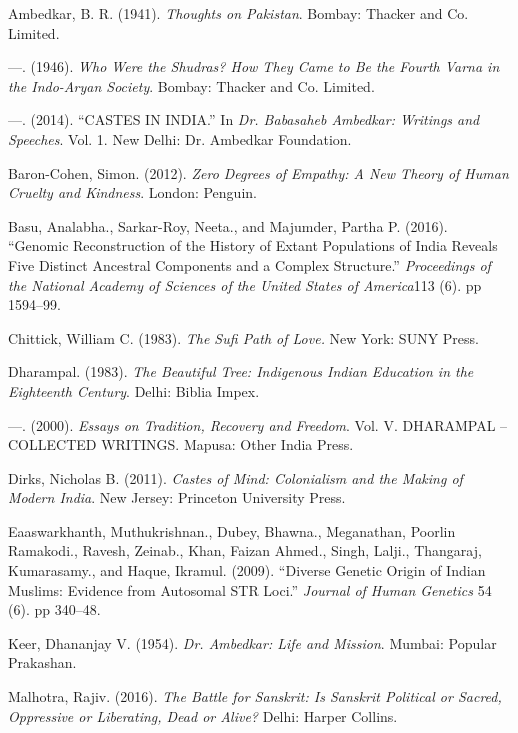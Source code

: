 \begin{thebibliography}{99}
\itemsep=0pt
 Ambedkar, B. R. (1941). \textit{Thoughts on Pakistan}. Bombay: Thacker and Co. Limited.

  ---. (1946). \textit{Who Were the Shudras? How They Came to Be the Fourth Varna in the Indo-Aryan Society}. Bombay: Thacker and Co. Limited.

  ---. (2014). “CASTES IN INDIA.” In \textit{Dr. Babasaheb Ambedkar: Writings and Speeches}. Vol. 1. New Delhi: Dr. Ambedkar Foundation.

  Baron-Cohen, Simon. (2012). \textit{Zero Degrees of Empathy: A New Theory of Human Cruelty and Kindness}. London: Penguin.

  Basu, Analabha., Sarkar-Roy, Neeta., and Majumder, Partha P. (2016). “Genomic Reconstruction of the History of Extant Populations of India Reveals Five Distinct Ancestral Components and a Complex Structure.” \textit{Proceedings of the National Academy of Sciences of the United States of America}113 (6). pp 1594–99.

  Chittick, William C. (1983). \textit{The Sufi Path of Love.} New York: SUNY Press.

  Dharampal. (1983). \textit{The Beautiful Tree: Indigenous Indian Education in the Eighteenth Century}. Delhi: Biblia Impex.

  ---. (2000). \textit{Essays on Tradition, Recovery and Freedom}. Vol. V. DHARAMPAL – COLLECTED WRITINGS. Mapusa: Other India Press.

  Dirks, Nicholas B. (2011). \textit{Castes of Mind: Colonialism and the Making of Modern India}. New Jersey: Princeton University Press.

  Eaaswarkhanth, Muthukrishnan., Dubey, Bhawna., Meganathan, Poorlin Ramakodi., Ravesh, Zeinab., Khan, Faizan Ahmed., Singh, Lalji., Thangaraj, Kumarasamy., and Haque, Ikramul. (2009). “Diverse Genetic Origin of Indian Muslims: Evidence from Autosomal STR Loci.” \textit{Journal of Human Genetics} 54 (6). pp 340–48.

  Keer, Dhananjay V. (1954). \textit{Dr. Ambedkar: Life and Mission}. Mumbai: Popular Prakashan.

  Malhotra, Rajiv. (2016). \textit{The Battle for Sanskrit: Is Sanskrit Political or Sacred, Oppressive or Liberating, Dead or Alive?} Delhi: Harper Collins.


\end{thebibliography}
